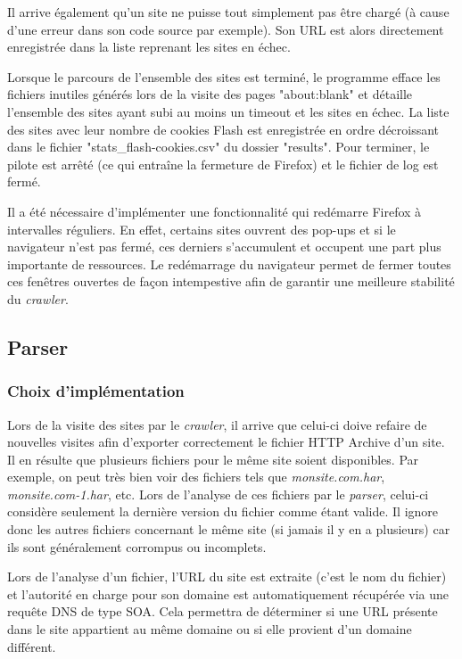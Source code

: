 Il arrive également qu'un site ne puisse tout simplement pas être chargé (à cause d'une erreur dans son code source par exemple). Son URL est alors directement enregistrée dans la liste reprenant les sites en échec.
\newline

Lorsque le parcours de l'ensemble des sites est terminé, le programme efface les fichiers inutiles générés lors de la visite des pages "about:blank" et détaille l'ensemble des sites ayant subi au moins un timeout et les sites en échec. La liste des sites avec leur nombre de cookies Flash est enregistrée en ordre décroissant dans le fichier "stats\_flash-cookies.csv" du dossier "results". Pour terminer, le pilote est arrêté (ce qui entraîne la fermeture de Firefox) et le fichier de log est fermé.
\newline

Il a été nécessaire d'implémenter une fonctionnalité qui redémarre Firefox à intervalles réguliers. En effet, certains sites ouvrent des pop-ups et si le navigateur n'est pas fermé, ces derniers s'accumulent et occupent une part plus importante de ressources. Le redémarrage du navigateur permet de fermer toutes ces fenêtres ouvertes de façon intempestive afin de garantir une meilleure stabilité du \textit{crawler}.

\subsection{Parser}
\label{parser}
\subsubsection{Choix d'implémentation}
Lors de la visite des sites par le \textit{crawler}, il arrive que celui-ci doive refaire de nouvelles visites afin d'exporter correctement le fichier HTTP Archive d'un site. Il en résulte que plusieurs fichiers pour le même site soient disponibles. Par exemple, on peut très bien voir des fichiers tels que \textit{monsite.com.har}, \textit{monsite.com-1.har}, etc. Lors de l'analyse de ces fichiers par le \textit{parser}, celui-ci considère seulement la dernière version du fichier comme étant valide. Il ignore donc les autres fichiers concernant le même site (si jamais il y en a plusieurs) car ils sont généralement corrompus ou incomplets.
\newline

Lors de l'analyse d'un fichier, l'URL du site est extraite (c'est le nom du fichier) et l'autorité en charge pour son domaine est automatiquement récupérée via une requête DNS de type SOA. Cela permettra de déterminer si une URL présente dans le site appartient au même domaine ou si elle provient d'un domaine différent.

